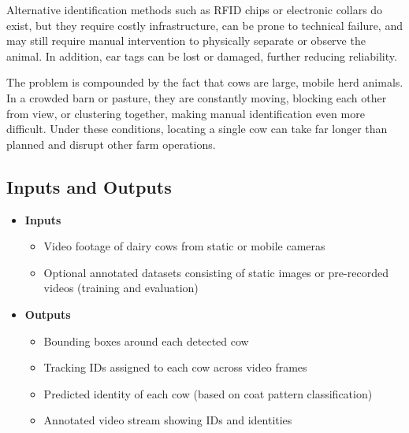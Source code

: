 \documentclass{article}
\begin{document}
    \setlength{\parskip}{0.6em} 

    Alternative identification methods such as RFID chips or electronic collars 
    do exist, but they require costly infrastructure, can be prone to technical 
    failure, and may still require manual intervention to physically separate or 
    observe the animal. In addition, ear tags can be lost or damaged, further reducing 
    reliability.  

    \setlength{\parskip}{0.6em} 

    The problem is compounded by the fact that cows are large, mobile herd animals. 
    In a crowded barn or pasture, they are constantly moving, blocking each other 
    from view, or clustering together, making manual identification even more 
    difficult. Under these conditions, locating a single cow can take far longer 
    than planned and disrupt other farm operations. 


\subsection{Inputs and Outputs}


\begin{itemize}
    \item \textbf{Inputs}
          \begin{itemize}
              \item Video footage of dairy cows from static or mobile cameras
          \item Optional annotated datasets consisting of static images or pre-recorded videos (training and evaluation)
          \end{itemize}

    \item \textbf{Outputs}
          \begin{itemize}
              \item Bounding boxes around each detected cow
              \item Tracking IDs assigned to each cow across video frames
              \item Predicted identity of each cow (based on coat pattern classification)
              \item Annotated video stream showing IDs and identities
          \end{itemize}
\end{itemize}


\end{document}
